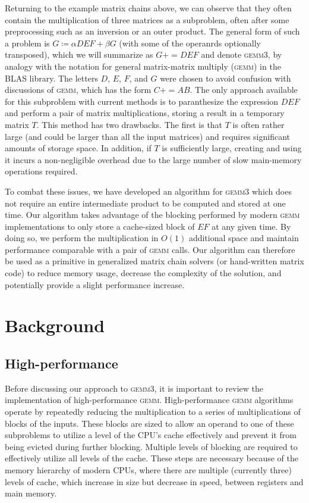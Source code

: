 \documentclass[12pt]{article}
\newcommand*{\pluseq}{\mathrel{{+}{=}}}
\newcommand*{\gemmt}{{\textsc{gemm3}}}
\newcommand*{\gemm}{{\textsc{gemm}}}
\begin{document}
Returning to the example matrix chains above, we can observe that they often contain the multiplication of three matrices as a subproblem, often after some preprocessing such as an inversion or an outer product.
The general form of such a problem is $G \coloneqq \alpha DEF + \beta G$ (with some of the operanrds optionally transposed), which we will summarize as $G \pluseq DEF$ and denote \gemmt{}, by analogy with the notation for general matrix-matrix multiply (\gemm{}) in the BLAS library.
The letters $D$, $E$, $F$, and $G$ were chosen to avoid confusion with discussions of \gemm{}, which has the form $C \pluseq AB$.
The only approach available for this subproblem with current methods is to paranthesize the expression $DEF$ and perform a pair of matrix multiplications, storing a result in a temporary matrix $T$.
This method has two drawbacks.
The first is that $T$ is often rather large (and could be larger than all the input matrices) and requires significant amounts of storage space.
In addition, if $T$ is sufficiently large, creating and using it incurs a non-negligible overhead due to the large number of slow main-memory operations required.

To combat these issues, we have developed an algorithm for \gemmt{} which does not require an entire intermediate product to be computed and stored at one time.
Our algorithm takes advantage of the blocking performed by modern \gemm{} implementations to only store a cache-sized block of $EF$ at any given time.
By doing so, we perform the multiplication in $O(1)$ additional space and maintain performance comparable with a pair of \gemm{} calls.
Our algorithm can therefore be used as a primitive in generalized matrix chain solvers (or hand-written matrix code) to reduce memory usage, decrease the complexity of the solution, and potentially provide a slight performance increase.

\section{Background}
\subsection{High-performance {\cmunicode \gemm{}}}
Before discussing our approach to \gemmt{}, it is important to review the implementation of high-performance \gemm{}.
High-performance \gemm{} algorithms operate by repeatedly reducing the multiplication to a series of multiplications of blocks of the inputs.
These blocks are sized to allow an operand to one of these subproblems to utilize a level of the CPU's cache effectively and prevent it from being evicted during further blocking.
Multiple levels of blocking are required to effectively utilize all levels of the cache.
These steps are necessary because of the memory hierarchy of modern CPUs, where there are multiple (currently three) levels of cache, which increase in size but decrease in speed, between registers and main memory.
\end{document}

